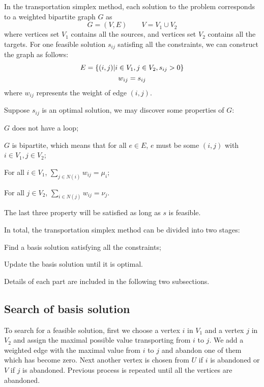 \documentclass[english]{pkupaper}
\begin{document}
In the transportation simplex method, each solution to the problem corresponds to a weighted bipartite graph $G$ as
\begin{equation}
	G=(V, E) \qquad V=V_1\cup V_2
\end{equation}
where vertices set $V_1$ contains all the sources, and vertices set $V_2$ contains all the targets. For one feasible solution $s_{ij}$ satisfing all the constraints, we can construct the graph as follows: 
\begin{equation}
\begin{gathered}
		E = \left\{ (i, j)\middle\vert i\in V_1, j\in V_2, s_{ij}>0 \right\}\\
		w_{ij}=s_{ij}
\end{gathered}
\end{equation}
where $w_{ij}$ represents the weight of edge $(i, j)$.

Suppose $s_{ij}$ is an optimal solution, we may discover some properties of $G$:
\begin{partlist}
	\item $G$ does not have a loop;
	\item $G$ is bipartite, which means that for all $ e\in E$, $e$ must be some $ (i, j) $ with $ i\in V_1, j\in V_2$;
	\item For all $i\in V_1$, $\sum_{j\in N(i)} w_{ij} = \mu_i$;
	\item For all $j\in V_2$, $\sum_{i\in N(j)} w_{ij} = \nu_j$.
\end{partlist}
The last three property will be satisfied as long as $s$ is feasible.

In total, the transportation simplex method can be divided into two stages:
\begin{partlist}
	\item Find a basis solution satisfying all the constraints;
	\item Update the basis solution until it is optimal.
\end{partlist}
Details of each part are included in the following two subsections.

\subsection{Search of basis solution}

To search for a feasible solution, first we choose a vertex $i$ in $V_1$ and a vertex $j$ in $V_2$ and assign the maximal possible value transporting from $i$ to $j$. We add a weighted edge with the maximal value from $i$ to $j$  and abandon one of them which has become zero. Next another vertex is chosen from $U$ if $i$ is abandoned or $V$ if $j$ is abandoned. Previous process is repeated until all the vertices are abandoned.
\end{document}
